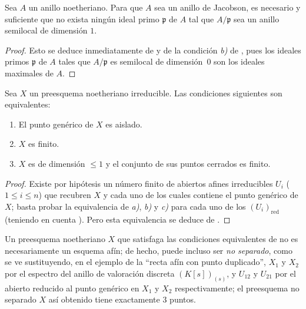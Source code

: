 \begin{corollary}[10.5.2]
\label{IV.10.5.2}
Sea $A$ un anillo noetheriano. Para que $A$ sea un anillo de Jacobson, es necesario y suficiente que no exista ningún ideal primo $\mathfrak p$ de $A$ tal que $A/\mathfrak p$ sea un anillo semilocal de dimensión $1$.
\end{corollary}

\begin{proof}
Esto se deduce inmediatamente de  y de la condición \emph{b)} de , pues los ideales primos $\mathfrak p$ de $A$ tales que $A/\mathfrak p$ es semilocal de dimensión~$0$ son los ideales maximales de $A$.
\end{proof}

\begin{corollary}[10.5.3]
\label{IV.10.5.3}
Sea $X$ un preesquema noetheriano irreducible.
Las condiciones siguientes son equivalentes:
\begin{enumerate}[label=\emph{\alph*)}]
  \item El punto genérico de $X$ es aislado.
  \item $X$ es finito.
  \item $X$ es de dimensión $\leq1$ y el conjunto de sus puntos cerrados es finito.
\end{enumerate}
\end{corollary}

\begin{proof}
Existe por hipótesis un número finito de abiertos afines irreducibles $U_i$ ($1\leq i\leq n$) que recubren $X$ y cada uno de los cuales contiene el punto genérico de $X$; basta probar la equivalencia de \emph{a)}, \emph{b)} y \emph{c)} para cada uno de los $(U_i)_{\mathrm{red}}$ (teniendo en cuenta ).
Pero esta equivalencia se deduce de .
\end{proof}

\begin{remark}[10.5.4]
\label{IV.10.5.4}
Un preesquema noetheriano $X$ que satisfaga las condiciones equivalentes de  no es necesariamente un esquema afín; de hecho, puede incluso ser \emph{no separado}, como se ve sustituyendo, en el ejemplo  de la ``recta afín con punto duplicado'', $X_1$ y $X_2$ por el espectro del anillo de valoración discreta $(K[s])_{(s)}$, y $U_{12}$ y $U_{21}$ por el abierto reducido al punto genérico en $X_1$ y $X_2$ respectivamente; el preesquema no separado $X$ así obtenido tiene exactamente $3$ puntos.
\end{remark}

